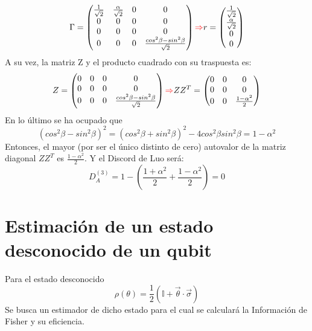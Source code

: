 \documentclass{book}
\begin{document}
\begin{equation}\label{eq2.166}\Gamma=\begin{pmatrix} \frac{1}{\sqrt{2}}&\frac{\alpha}{\sqrt{2}}&0&0\\0&0&0&0\\0&0&0&0\\ 0&0&0&\frac{cos^2\beta-sin^2\beta}{\sqrt{2}}\end{pmatrix}\textcolor{red}{\Rightarrow} r=\begin{pmatrix}\frac{1}{\sqrt{2}}\\\frac{\alpha}{\sqrt{2}}\\0\\0\end{pmatrix}\end{equation}
A su vez, la matriz Z y el producto cuadrado con su traspuesta es:
\begin{equation}\label{eq2.167}Z=\begin{pmatrix}0&0&0&0\\0&0&0&0\\0&0&0&\frac{cos^2\beta-sin^2\beta}{\sqrt{2}}\end{pmatrix}\textcolor{red}{\Rightarrow} ZZ^T=\begin{pmatrix}0&0&0\\0&0&0\\0&0&\frac{1-\alpha^2}{2}\end{pmatrix}\end{equation}
En lo último se ha ocupado que \begin{equation}\label{eq2.168}(cos^2\beta-sin^2\beta)^2=(cos^2\beta+sin^2\beta)^2-4cos^2\beta sin^2\beta= 1-\alpha^2\end{equation}
Entonces, el mayor (por ser el único distinto de cero) autovalor de la matriz diagonal $ZZ^T$ es $\frac{1-\alpha^2}{2}$. Y el Discord de Luo será:
\begin{equation}\label{eq2.169} D_A^{(3)}=1-(\frac{1+
\alpha^2}{2}+\frac{1-\alpha^2}{2})=0\end{equation}
\section{Estimación de un estado desconocido de un qubit}
Para el estado desconocido 
\begin{equation}\label{eq2.170}\rho(\theta)=\frac{1}{2}(\mathbb{I}+\vec{\theta}\cdot\vec{\sigma})\end{equation}
Se busca un estimador de dicho estado para el cual se calculará la Información de Fisher y su eficiencia.
\end{document}
